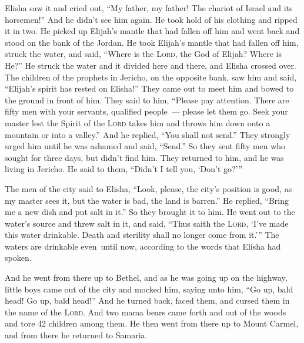\begin{inparaenum}
   Elisha saw it and cried out, ``My father, my father! The chariot of Israel and its horsemen!'' And he didn't see him again. He took hold of his clothing and ripped it in two.%
   He picked up Elijah's mantle that had fallen off him and went back and stood on the bank of the Jordan.%
   He took Elijah's mantle that had fallen off him, struck the water, and said, ``Where is the \textsc{Lord}, the God of Elijah? Where is He?'' He struck the water and it divided here and there, and Elisha crossed over.%
   The children of the prophets in Jericho, on the opposite bank, saw him and said, ``Elijah's spirit has rested on Elisha!'' They came out to meet him and bowed to the ground in front of him.%
   They said to him, ``Please pay attention. There are fifty men with your servants, qualified people~--- please let them go. Seek your master lest the Spirit of the \textsc{Lord} takes him and throws him down onto a mountain or into a valley.'' And he replied, ``You shall not send.''%
   They strongly urged him until he was ashamed and said, ``Send.'' So they sent fifty men who sought for three days, but didn't find him.%
   They returned to him, and he was living in Jericho. He said to them, ``Didn't I tell you, `Don't go?'\thinspace''%
  
   The men of the city said to Elisha, ``Look, please, the city's position is good, as my master sees it, but the water is bad, the land is barren.''%
   He replied, ``Bring me a new dish and put salt in it.'' So they brought it to him.%
   He went out to the water's source and threw salt in it, and said, ``Thus saith the \textsc{Lord}, `I've made this water drinkable. Death and sterility shall no longer come from it.'\thinspace''%
   The waters are drinkable even\understood\ until now, according to the words that Elisha had spoken.%
  
   And he went from there up to Bethel, and as he was going up on the highway, little boys came out of the city and mocked him, saying unto him, ``Go up, bald head! Go up, bald head!''%
   And he turned back, faced them, and cursed them in the name of the \textsc{Lord}. And two mama bears came forth and out of the woods and tore 42 children among them.%
   He then went from there up to Mount Carmel, and from there he returned to Samaria.%
\end{inparaenum}
